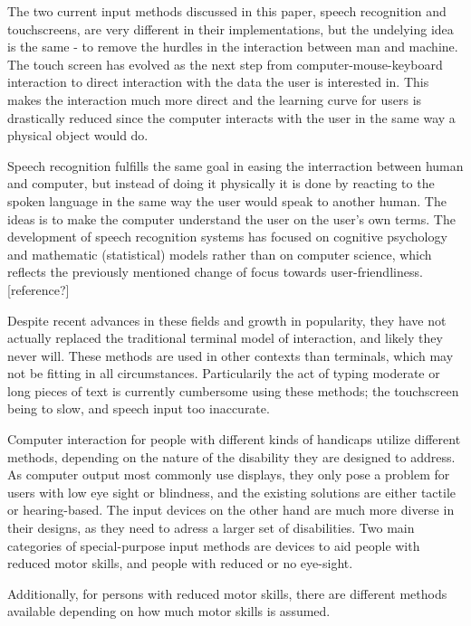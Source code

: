 
The two current input methods discussed in this paper, speech recognition and touchscreens, are very different in their implementations, but the undelying idea is the same - to remove the hurdles in the interaction between man and machine. The touch screen has evolved as the next step from computer-mouse-keyboard interaction to direct interaction with the data the user is interested in. This makes the interaction much more direct and the learning curve for users is drastically reduced since the computer interacts with the user in the same way a physical object would do.

Speech recognition fulfills the same goal in easing the interraction between human and computer, but instead of doing it physically it is done by reacting to the spoken language in the same way the user would speak to another human. The ideas is to make the computer understand the user on the user's own terms. The development of speech recognition systems has focused on cognitive psychology and mathematic (statistical) models rather than on computer science, which reflects the previously mentioned change of focus towards user-friendliness.[reference?]

Despite recent advances in these fields and growth in popularity, they have not actually replaced the traditional terminal model of interaction, and likely they never will. These methods are used in other contexts than terminals, which may not be fitting in all circumstances. Particularily the act of typing moderate or long pieces of text is currently cumbersome using these methods; the touchscreen being to slow, and speech input too inaccurate.


Computer interaction for people with different kinds of handicaps utilize different methods, depending on the nature of the disability they are designed to address. As computer output most commonly use displays, they only pose a problem for users with low eye sight or blindness, and the existing solutions are either tactile or hearing-based. The input devices on the other hand are much more diverse in their designs, as they need to adress a larger set of disabilities. Two main categories of special-purpose input methods are devices to aid people with reduced motor skills, and people with reduced or no eye-sight.

Additionally, for persons with reduced motor skills, there are different methods available depending on how much motor skills is assumed.

